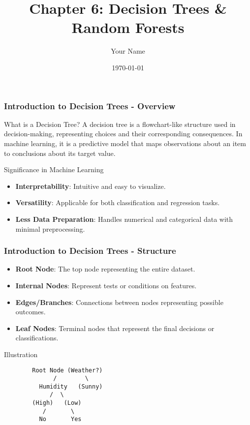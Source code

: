 \documentclass{beamer}
\title{Chapter 6: Decision Trees \& Random Forests}
\author{Your Name}
\institute{Your Institution}
\date{\today}
\begin{document}
\frame{\titlepage}

\begin{frame}[fragile]
    \frametitle{Introduction to Decision Trees - Overview}
    
    \begin{block}{What is a Decision Tree?}
        A decision tree is a flowchart-like structure used in decision-making, representing choices and their corresponding consequences. 
        In machine learning, it is a predictive model that maps observations about an item to conclusions about its target value.
    \end{block}

    \begin{block}{Significance in Machine Learning}
        \begin{itemize}
            \item \textbf{Interpretability}: Intuitive and easy to visualize.
            \item \textbf{Versatility}: Applicable for both classification and regression tasks.
            \item \textbf{Less Data Preparation}: Handles numerical and categorical data with minimal preprocessing.
        \end{itemize}
    \end{block}
\end{frame}

\begin{frame}[fragile]
    \frametitle{Introduction to Decision Trees - Structure}
    
    \begin{itemize}
        \item \textbf{Root Node}: The top node representing the entire dataset.
        \item \textbf{Internal Nodes}: Represent tests or conditions on features.
        \item \textbf{Edges/Branches}: Connections between nodes representing possible outcomes.
        \item \textbf{Leaf Nodes}: Terminal nodes that represent the final decisions or classifications.
    \end{itemize}
    
    \begin{block}{Illustration}
        \begin{verbatim}
        Root Node (Weather?)
              /        \
          Humidity   (Sunny)
             /  \
        (High)   (Low)
           /       \
          No       Yes
        \end{verbatim}
    \end{block}
\end{frame}
\end{document}
